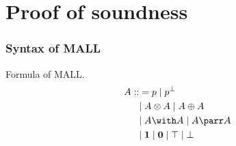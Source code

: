 \documentclass[dvipdfmx,cjk]{beamer}
\theoremstyle{example}
\begin{document}
\section{Proof of soundness}

\begin{frame}
  \frametitle{Syntax of MALL}
  \begin{definition}{Formula of MALL.}
    \begin{align*}
      A ::&= p              \; | \;
             p^{\bot}        \\
      &| \;
             A \otimes A    \; | \;
             A \oplus  A    \\
      &| \;
             A \with A      \; | \;
             A \parr A      \\
      &| \;
             \textbf{1}     \; | \;
             \textbf{0}     \; | \;
             \top           \; | \;
             \bot
    \end{align*}
  \end{definition}
\end{frame}
\end{document}
